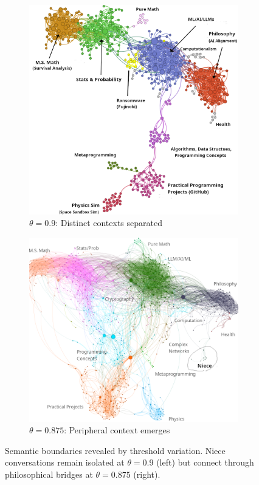 \documentclass{svproc}
\begin{document}
\begin{figure}[h]
\centering
\begin{subfigure}{0.48\textwidth}
    \centering
    \includegraphics[width=\textwidth]{./images/cluster-vis-topics-better.png}
    \caption{$\theta=0.9$: Distinct contexts separated}
\end{subfigure}
\hfill
\begin{subfigure}{0.48\textwidth}
    \centering
    \includegraphics[width=\textwidth]{./images/0.875-wild-better.png}
    \caption{$\theta=0.875$: Peripheral context emerges}
\end{subfigure}
\caption{Semantic boundaries revealed by threshold variation. Niece conversations remain isolated at $\theta=0.9$ (left) but connect through philosophical bridges at $\theta=0.875$ (right).}
\label{fig:semantic_boundary}
\end{figure}
\end{document}
